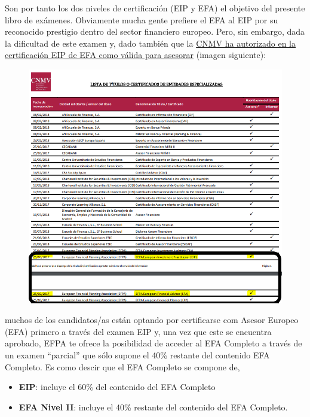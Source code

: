 \documentclass[
  letterpaper,
  DIV=11,
  numbers=noendperiod]{scrreprt}
\begin{document}
Son por tanto los dos niveles de certificación (EIP y EFA) el objetivo
del presente libro de exámenes. Obviamente mucha gente prefiere el EFA
al EIP por su reconocido prestigio dentro del sector financiero europeo.
Pero, sin embargo, dada la dificultad de este examen y, dado también que
la
\href{http://cnmv.es/Docportal/Legislacion/Titulos/ListadoTitulos.pdf}{CNMV
ha autorizado en la certificación EIP de EFA como válida para asesorar}
(imagen siguiente):

\begin{figure}

{\centering \includegraphics[width=1\textwidth,height=\textheight]{./images/lista_titulos.png}

}

\end{figure}

muchos de los candidatos/as están optando por certificarse com Asesor
Europeo (EFA) primero a través del examen EIP y, una vez que este se
encuentra aprobado, EFPA te ofrece la posibilidad de acceder al EFA
Completo a través de un examen ``parcial'' que sólo supone el 40\%
restante del contenido EFA Completo. Es como descir que el EFA Completo
se compone de,

\begin{itemize}
\item
  \textbf{EIP}: incluye el 60\% del contenido del EFA Completo
\item
  \textbf{EFA Nivel II}: incluye el 40\% restante del contenido del EFA
  Completo.
\end{itemize}
\end{document}
